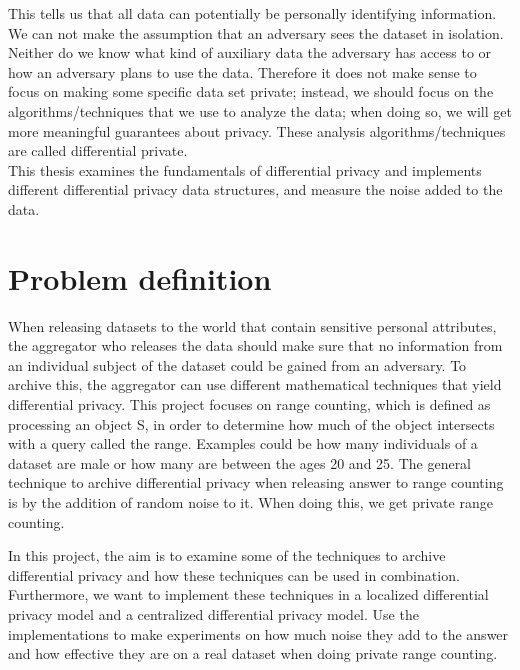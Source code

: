 \documentclass[11pt]{article}
\theoremstyle{definition}
\begin{document}
\noindent This tells us that all data can potentially be personally identifying information. We can not make the assumption that an adversary sees the dataset in isolation. Neither do we know what kind of auxiliary data the adversary has access to or how an adversary plans to use the data. Therefore it does not make sense to focus on making some specific data set private;  instead, we should focus on the algorithms/techniques that we use to analyze the data; when doing so, we will get more meaningful guarantees about privacy.  These analysis algorithms/techniques are called differential private.\\

This thesis examines the fundamentals of differential privacy and implements different differential privacy data structures, and measure the noise added to the data.

\section{Problem definition}
When releasing datasets to the world that contain sensitive personal attributes, the aggregator who releases the data should make sure that no information from an individual subject of the dataset could be gained from an adversary. To archive this, the aggregator can use different mathematical techniques that yield differential privacy.
This project focuses on range counting, which is defined as processing an object S, in order to determine how much of the object intersects with a query called the range. Examples could be how many individuals of a dataset are male or how many are between the ages 20 and 25. The general technique to archive differential privacy when releasing answer to range counting is by the addition of random noise to it. When doing this, we get private range counting.

In this project, the aim is to examine some of the techniques to archive differential privacy and how these techniques can be used in combination. Furthermore, we want to implement these techniques in a localized differential privacy model and a centralized differential privacy model. Use the implementations to make experiments on how much noise they add to the answer and how effective they are on a real dataset when doing private range counting.

\end{document}
